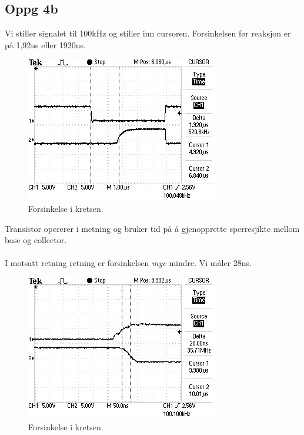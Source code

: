 \subsection{Oppg 4b}
Vi stiller signalet til 100kHz og stiller inn cursoren.
Forsinkelsen før reaksjon er på 1,92us eller 1920ns.
\begin{figure}[H]
  \caption{Forsinkelse i kretsen.}
  \centering
    \includegraphics[width=\textwidth]{4b.jpg}
\end{figure}
Transistor opererer i metning og bruker tid på å gjenopprette
sperresjikte mellom base og collector.
\\\\
I motsatt retning retning er forsinkelsen \emph{mye} mindre.
Vi måler 28ns.
\begin{figure}[H]
  \caption{Forsinkelse i kretsen.}
  \centering
    \includegraphics[width=\textwidth]{4bb.jpg}
\end{figure}
